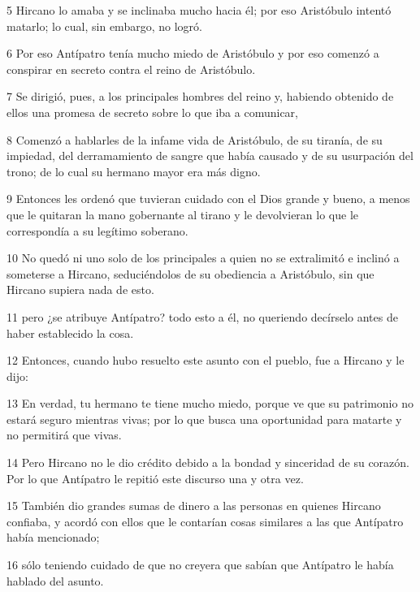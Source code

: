 \par 5 Hircano lo amaba y se inclinaba mucho hacia él; por eso Aristóbulo intentó matarlo; lo cual, sin embargo, no logró.

\par 6 Por eso Antípatro tenía mucho miedo de Aristóbulo y por eso comenzó a conspirar en secreto contra el reino de Aristóbulo.

\par 7 Se dirigió, pues, a los principales hombres del reino y, habiendo obtenido de ellos una promesa de secreto sobre lo que iba a comunicar,

\par 8 Comenzó a hablarles de la infame vida de Aristóbulo, de su tiranía, de su impiedad, del derramamiento de sangre que había causado y de su usurpación del trono; de lo cual su hermano mayor era más digno.

\par 9 Entonces les ordenó que tuvieran cuidado con el Dios grande y bueno, a menos que le quitaran la mano gobernante al tirano y le devolvieran lo que le correspondía a su legítimo soberano.

\par 10 No quedó ni uno solo de los principales a quien no se extralimitó e inclinó a someterse a Hircano, seduciéndolos de su obediencia a Aristóbulo, sin que Hircano supiera nada de esto.

\par 11 pero ¿se atribuye Antípatro? todo esto a él, no queriendo decírselo antes de haber establecido la cosa.

\par 12 Entonces, cuando hubo resuelto este asunto con el pueblo, fue a Hircano y le dijo:

\par 13 En verdad, tu hermano te tiene mucho miedo, porque ve que su patrimonio no estará seguro mientras vivas; por lo que busca una oportunidad para matarte y no permitirá que vivas.

\par 14 Pero Hircano no le dio crédito debido a la bondad y sinceridad de su corazón. Por lo que Antípatro le repitió este discurso una y otra vez.

\par 15 También dio grandes sumas de dinero a las personas en quienes Hircano confiaba, y acordó con ellos que le contarían cosas similares a las que Antípatro había mencionado;

\par 16 sólo teniendo cuidado de que no creyera que sabían que Antípatro le había hablado del asunto.

